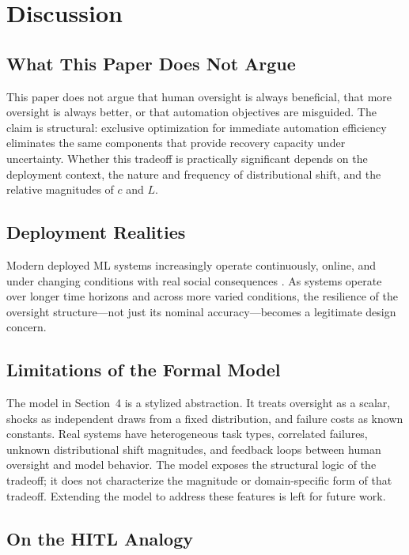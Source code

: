 \documentclass[11pt,a4paper]{article}
\theoremstyle{definition}
\theoremstyle{plain}
\theoremstyle{remark}
\begin{document}
\section{Discussion}

\subsection{What This Paper Does Not Argue}

This paper does not argue that human oversight is always beneficial, that more oversight is always better, or that automation objectives are misguided. The claim is structural: exclusive optimization for immediate automation efficiency eliminates the same components that provide recovery capacity under uncertainty. Whether this tradeoff is practically significant depends on the deployment context, the nature and frequency of distributional shift, and the relative magnitudes of $c$ and $L$.

\subsection{Deployment Realities}

Modern deployed ML systems increasingly operate continuously, online, and under changing conditions with real social consequences \citep{amodei2016}. As systems operate over longer time horizons and across more varied conditions, the resilience of the oversight structure---not just its nominal accuracy---becomes a legitimate design concern.

\subsection{Limitations of the Formal Model}

The model in Section~4 is a stylized abstraction. It treats oversight as a scalar, shocks as independent draws from a fixed distribution, and failure costs as known constants. Real systems have heterogeneous task types, correlated failures, unknown distributional shift magnitudes, and feedback loops between human oversight and model behavior. The model exposes the structural logic of the tradeoff; it does not characterize the magnitude or domain-specific form of that tradeoff. Extending the model to address these features is left for future work.

\subsection{On the HITL Analogy}
\end{document}
